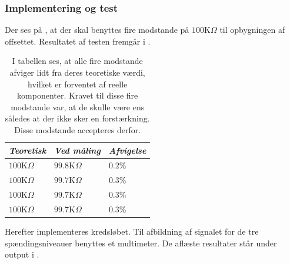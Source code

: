 \subsubsection{Implementering og test}
Der ses på , at der skal benyttes fire modstande på $100$K$\Omega$ til opbygningen af offsettet. Resultatet af testen fremgår i .
\begin{table}[H]
	\centering
	\begin{tabular}{|l|l|l|}
		\hline
		\textit{Teoretisk} & \textit{Ved måling} & \textit{Afvigelse} \\ \hline
		$100$K$\Omega$       & $99.8$K$\Omega$       & $0.2$\%               \\ \hline
		$100$K$\Omega$       & $99.7$K$\Omega$       & $0.3$\%               \\ \hline
		$100$K$\Omega$       & $99.7$K$\Omega$       & $0.3$\%               \\ \hline
		$100$K$\Omega$       & $99.7$K$\Omega$       & $0.3$\%               \\ \hline
	\end{tabular}
	\caption{I tabellen ses, at alle fire modstande afviger lidt fra deres teoretiske værdi, hvilket er forventet af reelle komponenter. Kravet til disse fire modstande var, at de skulle være ens således at der ikke sker en forstærkning. Disse modstande accepteres derfor.}
	\label{Tab:modstand_offset1}
\end{table}
\noindent Herefter implementeres kredsløbet. Til afbildning af signalet for de tre spændingsniveauer benyttes et multimeter. De aflæste resultater står under output i .
